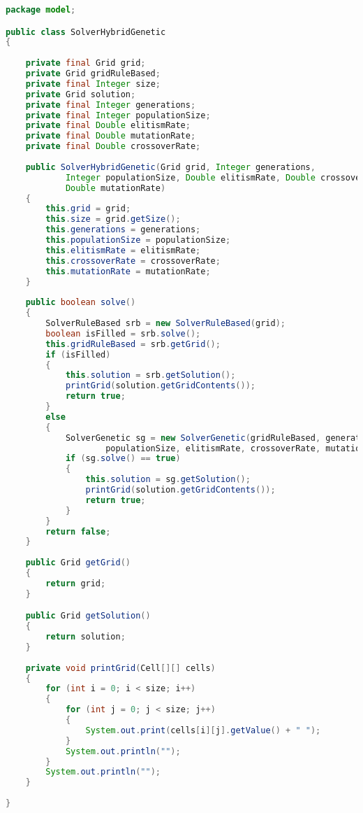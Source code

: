 \begin{lstlisting}[language=Java,basicstyle=\tiny,caption=SolverHybridGenetic.java]
package model;

public class SolverHybridGenetic
{
    
    private final Grid grid;
    private Grid gridRuleBased;
    private final Integer size;
    private Grid solution;
    private final Integer generations;
    private final Integer populationSize;
    private final Double elitismRate;
    private final Double mutationRate;
    private final Double crossoverRate;
    
    public SolverHybridGenetic(Grid grid, Integer generations, 
            Integer populationSize, Double elitismRate, Double crossoverRate, 
            Double mutationRate)
    {
        this.grid = grid;
        this.size = grid.getSize();
        this.generations = generations;
        this.populationSize = populationSize;
        this.elitismRate = elitismRate;
        this.crossoverRate = crossoverRate;
        this.mutationRate = mutationRate;
    }
    
    public boolean solve()
    {
        SolverRuleBased srb = new SolverRuleBased(grid);
        boolean isFilled = srb.solve();
        this.gridRuleBased = srb.getGrid();
        if (isFilled)
        {
            this.solution = srb.getSolution();
            printGrid(solution.getGridContents());
            return true;
        }
        else
        {
            SolverGenetic sg = new SolverGenetic(gridRuleBased, generations, 
                    populationSize, elitismRate, crossoverRate, mutationRate);
            if (sg.solve() == true)
            {
                this.solution = sg.getSolution();
                printGrid(solution.getGridContents());
                return true;
            }
        }
        return false;
    }
    
    public Grid getGrid()
    {
        return grid;
    }

    public Grid getSolution()
    {
        return solution;
    }
    
    private void printGrid(Cell[][] cells)
    {
        for (int i = 0; i < size; i++)
        {
            for (int j = 0; j < size; j++)
            {
                System.out.print(cells[i][j].getValue() + " ");
            }
            System.out.println("");
        }
        System.out.println("");
    }
    
}
\end{lstlisting}

